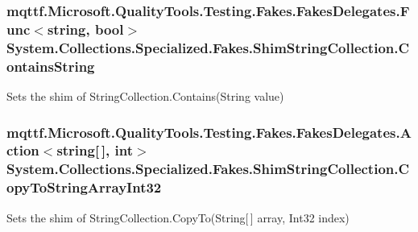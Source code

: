 \hypertarget{class_system_1_1_collections_1_1_specialized_1_1_fakes_1_1_shim_string_collection_a3740c7b0dbfb6acb9f235e46597db283}{
\subsubsection[{Contains\-String}]{\setlength{\rightskip}{0pt plus 5cm}mqttf.\-Microsoft.\-Quality\-Tools.\-Testing.\-Fakes.\-Fakes\-Delegates.\-Func$<$string, bool$>$ System.\-Collections.\-Specialized.\-Fakes.\-Shim\-String\-Collection.\-Contains\-String\hspace{0.3cm}{\ttfamily [set]}}}\label{class_system_1_1_collections_1_1_specialized_1_1_fakes_1_1_shim_string_collection_a3740c7b0dbfb6acb9f235e46597db283}


Sets the shim of String\-Collection.\-Contains(\-String value)

\hypertarget{class_system_1_1_collections_1_1_specialized_1_1_fakes_1_1_shim_string_collection_a7e2124b6968739bcfd42cfb2122c2990}{
\subsubsection[{Copy\-To\-String\-Array\-Int32}]{\setlength{\rightskip}{0pt plus 5cm}mqttf.\-Microsoft.\-Quality\-Tools.\-Testing.\-Fakes.\-Fakes\-Delegates.\-Action$<$string\mbox{[}$\,$\mbox{]}, int$>$ System.\-Collections.\-Specialized.\-Fakes.\-Shim\-String\-Collection.\-Copy\-To\-String\-Array\-Int32\hspace{0.3cm}{\ttfamily [set]}}}\label{class_system_1_1_collections_1_1_specialized_1_1_fakes_1_1_shim_string_collection_a7e2124b6968739bcfd42cfb2122c2990}


Sets the shim of String\-Collection.\-Copy\-To(\-String\mbox{[}$\,$\mbox{]} array, Int32 index)

